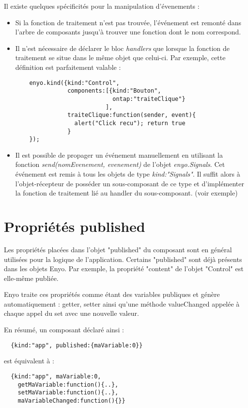 \documentclass[11pt,a4paper]{report}
\begin{document}
Il existe quelques spécificités pour la manipulation d'évenements :
\begin{itemize}
\item Si la fonction de traitement n'est pas trouvée, l'événement est remonté dans l'arbre de 
  composants jusqu'à trouver une fonction dont le nom correspond.
\item Il n'est nécessaire de déclarer le bloc \emph{handlers} que lorsque la fonction de traitement
  se situe dans le même objet que celui-ci. Par exemple, cette définition est parfaitement valable :
  \begin{lstlisting}
    enyo.kind({kind:"Control", 
               components:[{kind:"Bouton", 
                            ontap:"traiteClique"}
                          ],
               traiteClique:function(sender, event){
                 alert("Click recu"); return true
               }
    });
  \end{lstlisting}
\item Il est possible de propager un événement manuellement en utilisant la fonction 
  \emph{send(nomEvenement, evenement)} de l'objet \emph{enyo.Signals}. 
  Cet événement est remis à tous les objets de type \emph{kind:"Signals"}. Il suffit alors
  à l'objet-récepteur de posséder un sous-composant de ce type et d'implémenter la fonction de 
  traitement lié au handler du sous-composant. (voir exemple)
\end{itemize}

\section{Propriétés published}
Les propriétés placées dans l'objet "published" du composant sont en général utilisées pour
la logique de l'application. Certains "published" sont déjà présents dans les objets Enyo. 
Par exemple, la propriété "content" de l'objet "Control" est elle-même publiée.

Enyo traite ces propriétés comme étant des variables publiques et génère automatiquement : 
getter, setter ainsi qu'une méthode valueChanged appelée à chaque appel du set avec une nouvelle valeur.
\\\medskip

En résumé, un composant déclaré ainsi : 
\begin{lstlisting}
  {kind:"app", published:{maVariable:0}}
\end{lstlisting}
est équivalent à :
\begin{lstlisting}
  {kind:"app", maVariable:0, 
    getMaVariable:function(){..}, 
    setMaVariable:function(){..}, 
    maVariableChanged:function(){}}
\end{lstlisting}
\end{document}
